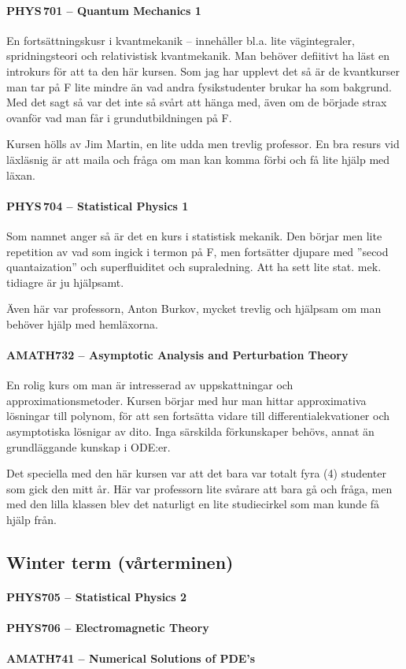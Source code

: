 \documentclass[11pt,a4paper, english, swedish]{article}
\begin{document}
\paragraph{PHYS\,701 -- Quantum Mechanics 1}
En fortsättningskusr i kvantmekanik -- innehåller bl.a. lite
vägintegraler, spridningsteori och relativistisk kvantmekanik. Man
behöver defiitivt ha läst en introkurs för att ta den här kursen. Som
jag har upplevt det så är de kvantkurser man tar på F lite mindre än
vad andra fysikstudenter brukar ha som bakgrund\footnotemark{}. Med
det sagt så var det inte så svårt att hänga med, även om de började
strax ovanför vad man får i grundutbildningen på F. 

Kursen hölls av Jim Martin, en lite udda men trevlig professor. En bra
resurs vid läxläsnig är att maila och fråga om man kan komma förbi och
få lite hjälp med läxan. 


\paragraph{PHYS\,704 -- Statistical Physics 1}
Som namnet anger så är det en kurs i statistisk mekanik. Den börjar
men lite repetition av vad som ingick i termon på F, men fortsätter
djupare med ''secod quantaization'' och superfluiditet och
supraledning. Att ha sett lite stat. mek. tidiagre är ju hjälpsamt.

Även här var professorn, Anton Burkov, mycket trevlig och hjälpsam om
man behöver hjälp med hemläxorna. 


\paragraph{AMATH732 -- Asymptotic Analysis and Perturbation Theory}
En rolig kurs om man är intresserad av uppskattningar och
approximationsmetoder. Kursen börjar med hur man hittar approximativa
lösningar till polynom, för att sen fortsätta vidare till
differentialekvationer och asymptotiska lösnigar av dito. 
Inga särskilda förkunskaper behövs, annat än grundläggande kunskap i
ODE:er. 

Det speciella med den här kursen var att det bara var totalt fyra (4)
studenter som gick den mitt år. Här var professorn lite svårare att
bara gå och fråga, men med den lilla klassen blev det naturligt en
lite studiecirkel som man kunde få hjälp från. 


\subsection{Winter term (vårterminen)}


\paragraph{PHYS705 -- Statistical Physics 2}


\paragraph{PHYS706 --  Electromagnetic Theory}

\paragraph{AMATH741 -- Numerical Solutions of PDE's}
\end{document}
